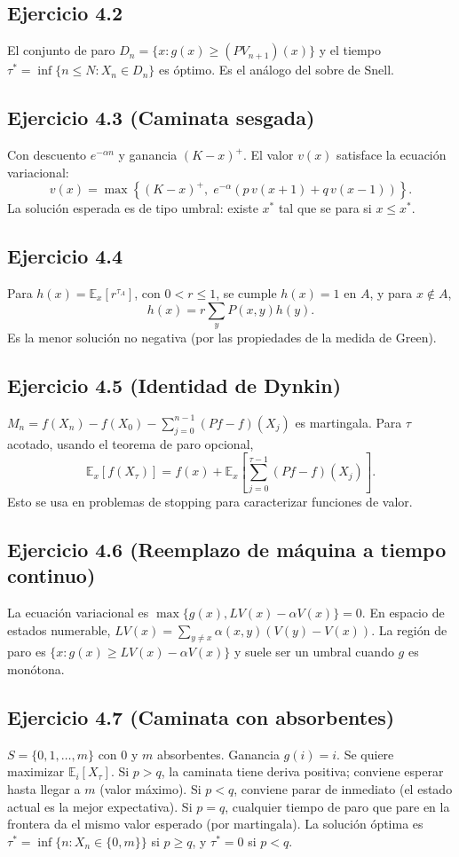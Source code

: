 \documentclass[12pt]{article}
\newcommand{\E}{\mathbb{E}}
\newcommand{\1}{\mathbf{1}}
\begin{document}
\subsection{Ejercicio 4.2}
El conjunto de paro $D_n=\{x:g(x)\ge (PV_{n+1})(x)\}$ y el tiempo $\tau^*=\inf\{n\le N:X_n\in D_n\}$ es \'optimo. Es el an\'alogo del sobre de Snell.

\subsection{Ejercicio 4.3 (Caminata sesgada)}
Con descuento $e^{-\alpha n}$ y ganancia $(K-x)^+$. El valor $v(x)$ satisface la ecuaci\'on variacional:
\[
v(x)=\max\left\{(K-x)^+,\;e^{-\alpha}(p\,v(x+1)+q\,v(x-1))\right\}.
\]
La soluci\'on esperada es de tipo umbral: existe $x^*$ tal que se para si $x\le x^*$.

\subsection{Ejercicio 4.4}
Para $h(x)=\E_x[r^{\tau_A}]$, con $0<r\le1$, se cumple $h(x)=1$ en $A$, y para $x\notin A$,
\[
h(x)=r\sum_y P(x,y)h(y).
\]
Es la menor soluci\'on no negativa (por las propiedades de la medida de Green).

\subsection{Ejercicio 4.5 (Identidad de Dynkin)}
$M_n=f(X_n)-f(X_0)-\sum_{j=0}^{n-1}(Pf-f)(X_j)$ es martingala. Para $\tau$ acotado, usando el teorema de paro opcional,
\[
\E_x[f(X_\tau)]=f(x)+\E_x\left[\sum_{j=0}^{\tau-1}(Pf-f)(X_j)\right].
\]
Esto se usa en problemas de stopping para caracterizar funciones de valor.

\subsection{Ejercicio 4.6 (Reemplazo de m\'aquina a tiempo continuo)}
La ecuaci\'on variacional es $\max\{g(x), LV(x)-\alpha V(x)\}=0$. En espacio de estados numerable, $LV(x)=\sum_{y\neq x}\alpha(x,y)(V(y)-V(x))$. La regi\'on de paro es $\{x:g(x)\ge LV(x)-\alpha V(x)\}$ y suele ser un umbral cuando $g$ es mon\'otona.

\subsection{Ejercicio 4.7 (Caminata con absorbentes)}
$S=\{0,1,\dots,m\}$ con $0$ y $m$ absorbentes. Ganancia $g(i)=i$. Se quiere maximizar $\E_i[X_\tau]$. Si $p>q$, la caminata tiene deriva positiva; conviene esperar hasta llegar a $m$ (valor m\'aximo). Si $p<q$, conviene parar de inmediato (el estado actual es la mejor expectativa). Si $p=q$, cualquier tiempo de paro que pare en la frontera da el mismo valor esperado (por martingala). La soluci\'on \'optima es $\tau^*=\inf\{n:X_n\in\{0,m\}\}$ si $p\ge q$, y $\tau^*=0$ si $p<q$.
\end{document}
